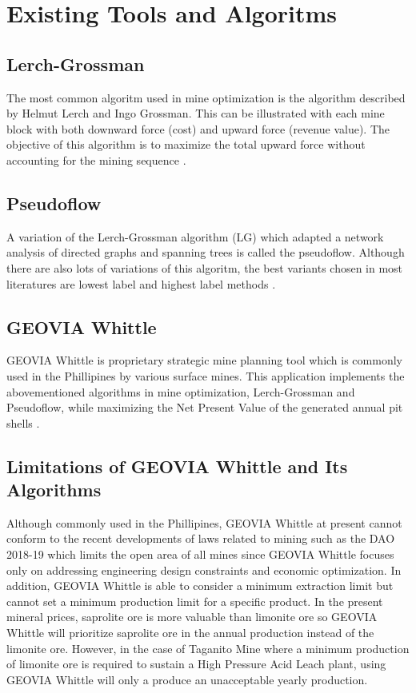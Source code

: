 \documentclass[12pt]{report}
\begin{document}
\section{Existing Tools and Algoritms}

\subsection{Lerch-Grossman}

The most common algoritm used in mine optimization is the algorithm described by Helmut Lerch and Ingo Grossman.
This can be illustrated with each mine block with both downward force (cost) and upward force (revenue value).
The objective of this algorithm is to maximize the total upward force without accounting for the mining sequence \cite{IMS}.

\subsection{Pseudoflow}

A variation of the Lerch-Grossman algorithm (LG) which adapted a network analysis of directed graphs and spanning trees is called the pseudoflow.
Although there are also lots of variations of this algoritm, the best variants chosen in most literatures are lowest label and highest label methods \cite{pseudoflow}.

\subsection{GEOVIA Whittle}

GEOVIA Whittle is proprietary strategic mine planning tool which is commonly used in the Phillipines by various surface mines.
This application implements the abovementioned algorithms in mine optimization, Lerch-Grossman and Pseudoflow, while maximizing the Net Present Value of the generated annual pit shells \cite{whittle}.

\subsection{Limitations of GEOVIA Whittle and Its Algorithms}

Although commonly used in the Phillipines, GEOVIA Whittle at present cannot conform to the recent developments of laws related to mining such as the DAO 2018-19 \cite{DAO2018-19} which limits the open area of all mines since GEOVIA Whittle focuses only on addressing engineering design constraints and economic optimization.
In addition, GEOVIA Whittle is able to consider a minimum extraction limit but cannot set a minimum production limit for a specific product.
In the present mineral prices, saprolite ore is more valuable than limonite ore so GEOVIA Whittle will prioritize saprolite ore in the annual production instead of the limonite ore.
However, in the case of Taganito Mine where a minimum production of limonite ore is required to sustain a High Pressure Acid Leach plant, using GEOVIA Whittle will only a produce an unacceptable yearly production.
\end{document}
